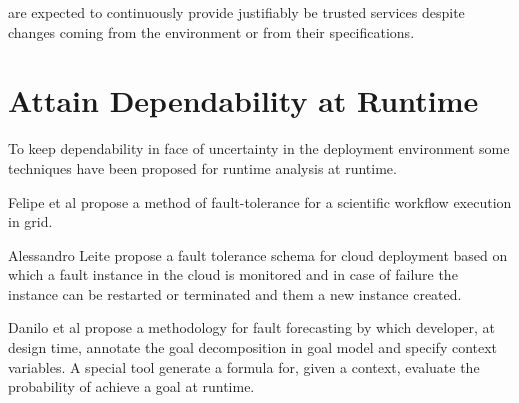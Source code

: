 

 \cite{laprie_dependability_2008} are expected to continuously provide justifiably be trusted services despite changes coming from the environment or from their specifications.


\section{Attain Dependability at Runtime }
To keep dependability in face of uncertainty in the deployment environment some techniques have been proposed for runtime analysis at runtime.


Felipe et al\cite{guimaraes_framework_2013} propose a method of fault-tolerance for a scientific workflow execution in grid.

Alessandro Leite \cite{ferreira_leite_user_2014} propose a fault tolerance schema for cloud deployment based on which a fault instance in the cloud is monitored and in case of failure the instance can be restarted or terminated and them a new instance created.

Danilo et al\cite{mendonca_dependability_2015} propose a methodology for fault forecasting by which developer, at design time, annotate the goal decomposition in goal model and specify context variables. A special tool generate a formula for, given a context, evaluate the probability of achieve a goal at runtime.



